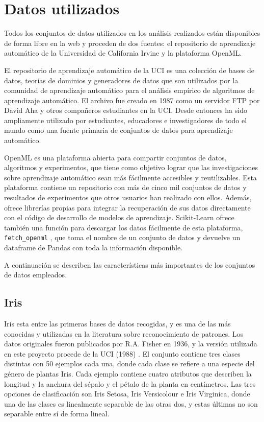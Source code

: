 \section{Datos utilizados}
\label{sec:datasets}


Todos los conjuntos de datos utilizados en los análisis realizados están disponibles de forma libre en la web y proceden de dos fuentes: el repositorio de aprendizaje automático de la Universidad de California Irvine y la plataforma OpenML.

El repositorio de aprendizaje automático de la UCI \cite{ml-uci} es una colección de bases de datos, teorías de dominios y generadores de datos que son utilizados por la comunidad de aprendizaje automático para el análisis empírico de algoritmos de aprendizaje automático. El archivo fue creado en 1987 como un servidor FTP por David Aha y otros compañeros estudiantes en la UCI. Desde entonces ha sido ampliamente utilizado por estudiantes, educadores e investigadores de todo el mundo como una fuente primaria de conjuntos de datos para aprendizaje automático.

OpenML \cite{openml} es una plataforma abierta para compartir conjuntos de datos, algoritmos y experimentos, que tiene como objetivo lograr que las investigaciones sobre aprendizaje automático sean más fácilmente accesibles y reutilizables. Esta plataforma contiene un repositorio con más de cinco mil conjuntos de datos y resultados de experimentos que otros usuarios han realizado con ellos. Además, ofrece librerías propias para integrar la recuperación de sus datos directamente con el código de desarrollo de modelos de aprendizaje. Scikit-Learn ofrece también una función para descargar los datos fácilmente de esta plataforma, \texttt{fetch\_openml} \cite{sk-fetch-openml}, que toma el nombre de un conjunto de datos y devuelve un dataframe de Pandas con toda la información disponible.

A continuación se describen las características más importantes de los conjuntos de datos empleados.

\subsection{Iris}

Iris esta entre las primeras bases de datos recogidas, y es una de las más conocidas y utilizadas en la literatura sobre reconocimiento de patrones. Los datos originales fueron publicados por R.A. Fisher en 1936, y la versión utilizada en este proyecto procede de la UCI (1988) \cite{iris-dataset}.
El conjunto contiene tres clases distintas con 50 ejemplos cada una, donde cada clase se refiere a una especie del género de plantas Iris. Cada ejemplo contiene cuatro atributos que describen la longitud y la anchura del sépalo y el pétalo de la planta en centímetros. Las tres opciones de clasificación son Iris Setosa, Iris Versicolour e Iris Virginica, donde una de las clases es linealmente separable de las otras dos, y estas últimas no son separable entre sí de forma lineal.


